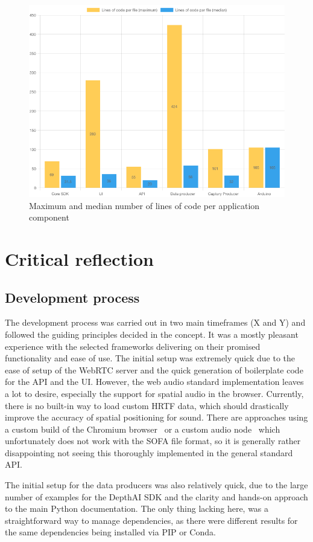 \begin{figure}[h]
\centering
\includegraphics[scale=0.5]{04_Artefakte/01_Abbildungen/code-stats-loc}
\caption[Lines of code]{Maximum and median number of lines of code per application component\protect}
\label{fig:linesOfCode}
\end{figure}

\section{Critical reflection}
\label{sec:critical-reflection}

\subsection{Development process}

The development process was carried out in two main timeframes (X and Y) and followed the guiding principles decided in the concept.
It was a mostly pleasant experience with the selected frameworks delivering on their promised functionality and ease of use.
The initial setup was extremely quick due to the ease of setup of the WebRTC server and the quick generation of boilerplate code for the \ac{API} and the \ac{UI}.
However, the web audio standard implementation leaves a lot to desire, especially the support for spatial audio in the browser.
Currently, there is no built-in way to load custom \ac{HRTF} data, which should drastically improve the accuracy of spatial positioning for sound.
There are approaches using a custom build of the Chromium browser~\parencite{chromiumCustomHrtf} or a custom audio node~\parencite{customHrtfAudioNode} which unfortunately does not work with the \ac{SOFA} file format, so it is generally rather disappointing not seeing this thoroughly implemented in the general standard \ac{API}.

The initial setup for the data producers was also relatively quick, due to the large number of examples for the DepthAI \ac{SDK} and the clarity and hands-on approach to the main Python documentation.
The only thing lacking here, was a straightforward way to manage dependencies, as there were different results for the same dependencies being installed via PIP or Conda.

